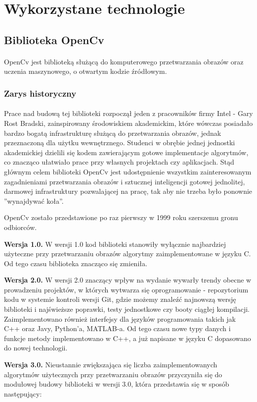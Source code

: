 \documentclass[a4paper,12pt]{article}
\begin{document}
	\section{Wykorzystane technologie}
		\subsection{Biblioteka OpenCv}
			\paragraph{\noindent} 
				OpenCv jest biblioteką służącą do komputerowego przetwarzania obrazów oraz uczenia maszynowego, o otwartym kodzie źródłowym.
		\subsubsection{Zarys historyczny}
			\paragraph{\noindent}  Prace nad budową tej biblioteki rozpoczął jeden z        pracowników firmy Intel - Gary Rost Bradski, zainspirowany środowiskiem     akademickim, które wówczas posiadało bardzo bogatą                          infrastrukturę służącą do przetwarzania obrazów, jednak                     przeznaczoną dla użytku wewnętrznego. Studenci w obrębie jednej             jednostki akademickiej dzielili się kodem zawierającym gotowe               implementacje algorytmów, co znacząco ułatwiało prace przy własnych         projektach czy aplikacjach. 
				Stąd głównym celem biblioteki OpenCv jest udostępnienie wszystkim zainteresowanym zagadnieniami przetwarzania obrazów i sztucznej inteligencji gotowej jednolitej, darmowej infrastruktury pozwalającej na pracę, tak aby nie trzeba było ponownie ''wynajdywać koła''.\par
				OpenCv zostało przedstawione po raz pierwszy w 1999 roku szerszemu gronu odbiorców. \par  
                \textbf{Wersja 1.0.} W wersji 1.0 kod biblioteki stanowiły wyłącznie najbardziej użyteczne przy przetwarzaniu obrazów
				algorytmy zaimplementowane w języku C. 
				Od tego czasu biblioteka znacząco się zmieniła. \par
			    \textbf{Wersja 2.0.}	W wersji 2.0 znaczący wpływ na wydanie wywarły trendy obecne w prowadzeniu projektów, w których wytwarza się oprogramowanie - repozytorium kodu w systemie kontroli wersji Git, gdzie możemy znaleźć najnowszą wersję biblioteki i najświeższe poprawki, testy jednostkowe czy booty ciągłej kompilacji. 
				Zaimplementowano również interfejsy dla języków programowania takich jak C++ oraz Javy, Python’a, MATLAB-a.
				Od tego czasu nowe typy danych i funkcje metody implementowano w C++, a już napisane w języku C dopasowano do nowej technologii. \par
				\textbf{Wersja 3.0.} Nieustannie zwiększająca się liczba zaimplementowanych algorytmów użytecznych przy przetwarzaniu obrazów przyczyniła się do modułowej budowy biblioteki w wersji 3.0, która przedstawia się w sposób następujący:
                
\end{document}
